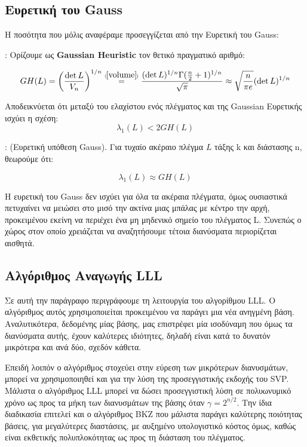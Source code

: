 \subsection{Ευρετική του \lt Gauss}

H ποσότητα που μόλις αναφέραμε προσεγγίζεται από την Ευρετική του Gauss:

\begin{definition}: Ορίζουμε ως \textbf{Gaussian Heuristic} τον θετικό πραγματικό αριθμό:

\begin{equation}
    GH(L) = \bigg( \dfrac{\det{L}}{V_n} \bigg) ^{1/n} \stackrel{\scriptscriptstyle(\mkern-1.5mu\ref{volume}\mkern-1.5mu)}{=}  \dfrac{(\det{L})^{1/n} \Gamma(\frac{n}{2} + 1)^{1/n} }{\sqrt{\pi}} \approx \sqrt{\dfrac{n}{\pi e}} (\det{L})^{1/n}
\end{equation}

\end{definition}

Αποδεικνύεται ότι μεταξύ του ελαχίστου ενός πλέγματος και της \lt Gaussian Ευρετικής ισχύει η σχέση: $$ λ_1(L) < 2GH(L) $$

\begin{definition} : (Ευρετική υπόθεση Gauss). Για τυχαίο ακέραιο πλέγμα $ L $ τάξης k και διάστασης n, θεωρούμε ότι: 

$$ \lambda_1(L) \approx GH(L) $$

\end{definition}

Η ευρετική του Gauss δεν ισχύει για όλα τα ακέραια πλέγματα, όμως ουσιαστικά πετυχαίνει να μειώσει στο μισό την ακτίνα μιας μπάλας με κέντρο την αρχή, προκειμένου εκείνη να περιέχει ένα μη μηδενικό σημείο του πλέγματος L. Συνεπώς ο χώρος στον οποίο χρειάζεται να αναζητήσουμε τέτοια διανύσματα περιορίζεται αισθητά.  


\subsection{Αλγόριθμος Αναγωγής \lt LLL}

Σε αυτή την παράγραφο περιγράφουμε τη λειτουργία του αλγορίθμου LLL. Ο αλγόριθμος αυτός χρησιμοποιείται προκειμένου να παράγει μια νέα ανηγμένη βάση. Αναλυτικότερα, δεδομένης μίας βάσης, μας επιστρέφει μία ισοδύναμη που όμως τα διανύσματα αυτής, έχουν καλύτερες ιδιότητες, δηλαδή είναι κατά το δυνατόν μικρότερα και ανά δύο, σχεδόν κάθετα.

Επειδή λοιπόν ο αλγόριθμος στοχεύει στην εύρεση των μικρότερων διανυσμάτων, μπορεί να χρησιμοποιηθεί και για την λύση της προσεγγιστικής εκδοχής του SVP. Μάλιστα ο αλγόριθμος LLL μπορεί να δώσει προσεγγιστική λύση σε πολυωνυμικό χρόνο ως προς τα μήκη των διανυσμάτων της βάσης όταν $ γ = 2^{n/2} $. Την ίδια διαδικασία επιτελεί και ο αλγόριθμος BKZ που μάλιστα παράγει καλύτερης ποιότητας βάσεις, για μεγαλύτερες διαστάσεις, με αυξημένο υπολογιστικό κόστος όμως, καθώς είναι εκθετικής πολυπλοκότητας ως προς τη διάσταση του πλέγματος. 

